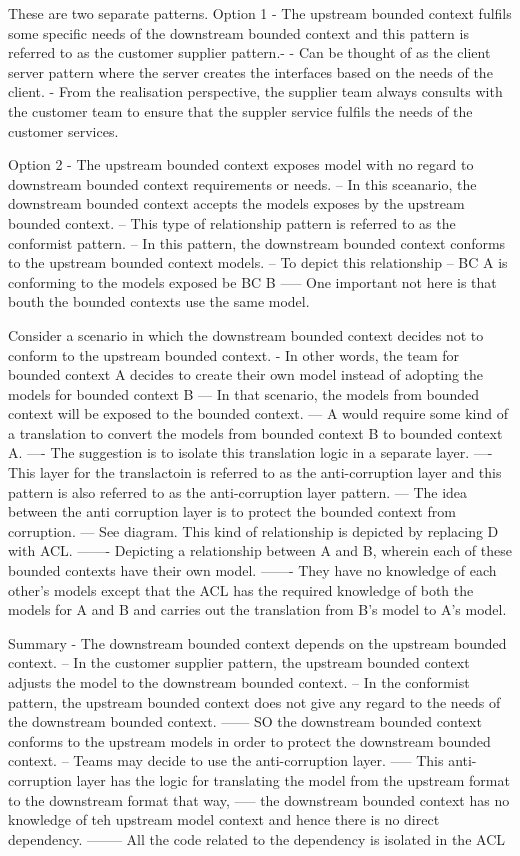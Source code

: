 These are two separate patterns.
Option 1 - The upstream bounded context fulfils some specific needs of the downstream bounded context and this pattern is referred to as the customer supplier pattern.-
- Can be thought of as the client server pattern where the server creates the interfaces based on the needs of the client.
- From the realisation perspective, the supplier team always consults with the customer team to ensure that the suppler service fulfils the needs of the customer services.

Option 2 - The upstream bounded context exposes model with no regard to downstream bounded context requirements or needs.
-- In this sceanario, the downstream bounded context accepts the models exposes by the upstream bounded context.
-- This type of relationship pattern is referred to as the conformist pattern.
-- In this pattern, the downstream bounded context conforms to the upstream bounded context models.
-- To depict this relationship %
-- BC A is conforming to the models exposed be BC B
----- One important not here is that bouth the bounded contexts use the same model.


Consider a scenario in which the downstream bounded context decides not to conform to the upstream bounded context.
- In other words, the team for bounded context A decides to create their own model instead of adopting the models for bounded context B
--- In that scenario, the models from bounded context will be exposed to the bounded context.
--- A would require some kind of a translation to convert the models from bounded context B to bounded context A.
---- The suggestion is to isolate this translation logic in a separate layer.
---- This layer for the translactoin is referred to as the anti-corruption layer and this pattern is also referred to as the anti-corruption layer pattern.
--- The idea between the anti corruption layer is to protect the bounded context from corruption.
--- See diagram. This kind of relationship is depicted by replacing D with ACL.
------- Depicting a relationship between A and B, wherein each of these bounded contexts have their own model.
------- They have no knowledge of each other's models except that the ACL has the required knowledge of both the models for A and B and carries out the translation from B's model to A's model.

Summary
- The downstream bounded context depends on the upstream bounded context.
-- In the customer supplier pattern, the upstream bounded context adjusts the model to the downstream bounded context.
-- In the conformist pattern, the upstream bounded context does not give any regard to the needs of the downstream bounded context.
------ SO the downstream bounded context conforms to the upstream models in order to protect the downstream bounded context.
-- Teams may decide to use the anti-corruption layer.
----- This anti-corruption layer has the logic for translating the model from the upstream format to the downstream format that way,
----- the downstream bounded context has no knowledge of teh upstream model context and hence there is no direct dependency.
-------- All the code related to the dependency is isolated in the ACL

